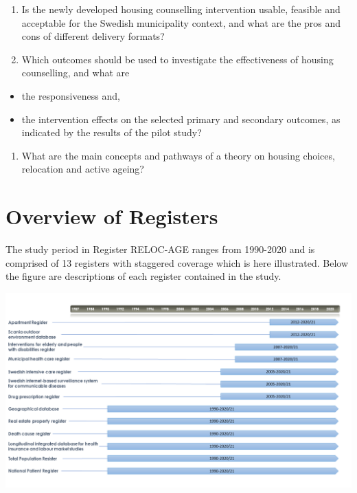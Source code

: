 \documentclass[
]{book}
\providecommand{\tightlist}{%
  \setlength{\itemsep}{0pt}\setlength{\parskip}{0pt}}
\begin{document}
\begin{enumerate}
\def\labelenumi{\arabic{enumi}.}
\setcounter{enumi}{7}
\tightlist
\item
  Is the newly developed housing counselling intervention usable, feasible and acceptable for the Swedish municipality context, and what are the pros and cons of different delivery formats?
\item
  Which outcomes should be used to investigate the effectiveness of housing counselling, and what are
\end{enumerate}

\begin{itemize}
\tightlist
\item
  the responsiveness and,
\item
  the intervention effects on the selected primary and secondary outcomes, as indicated by the results of the pilot study?
\end{itemize}

\begin{enumerate}
\def\labelenumi{\arabic{enumi}.}
\setcounter{enumi}{9}
\tightlist
\item
  What are the main concepts and pathways of a theory on housing choices, relocation and active ageing?
\end{enumerate}

\hypertarget{overview-of-registers}{%
\chapter{Overview of Registers}\label{overview-of-registers}}

The study period in Register RELOC-AGE ranges from 1990-2020 and is comprised of 13 registers with staggered coverage which is here illustrated. Below the figure are descriptions of each register contained in the study.

\includegraphics[width=1\linewidth]{output/figures/registers_timeline}
\end{document}
